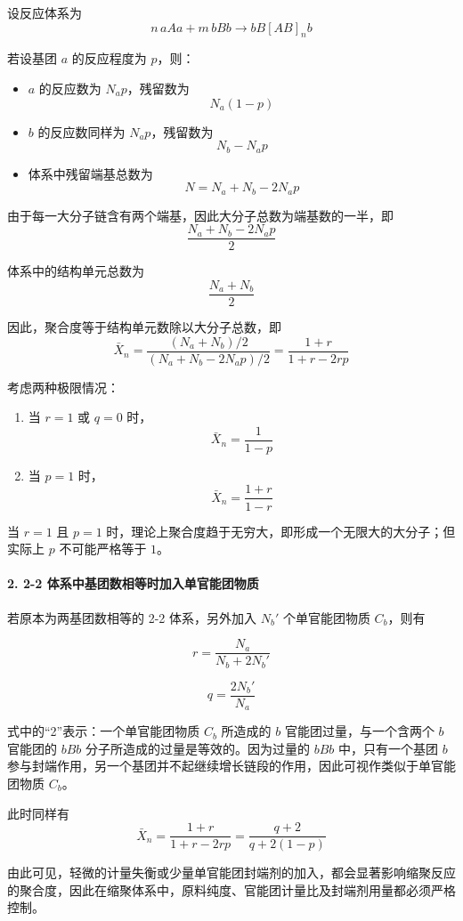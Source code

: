 ﻿\documentclass[12pt,a4paper]{article}
\begin{document}
设反应体系为
\[
n\,aAa+m\,bBb \longrightarrow bB[AB]_n b
\]

若设基团 $a$ 的反应程度为 $p$，则：

\begin{itemize}
    \item $a$ 的反应数为 $N_a p$，残留数为
    \[
    N_a(1-p)
    \]
    \item $b$ 的反应数同样为 $N_a p$，残留数为
    \[
    N_b-N_a p
    \]
    \item 体系中残留端基总数为
    \[
    N=N_a+N_b-2N_a p
    \]
\end{itemize}

由于每一大分子链含有两个端基，因此大分子总数为端基数的一半，即
\[
\frac{N_a+N_b-2N_a p}{2}
\]

体系中的结构单元总数为
\[
\frac{N_a+N_b}{2}
\]

因此，聚合度等于结构单元数除以大分子总数，即
\[
\bar{X}_n=
\frac{(N_a+N_b)/2}{(N_a+N_b-2N_a p)/2}
=
\frac{1+r}{1+r-2rp}
\]

考虑两种极限情况：

\begin{enumerate}[1)]
    \item 当 $r=1$ 或 $q=0$ 时，
    \[
    \bar{X}_n=\frac{1}{1-p}
    \]

    \item 当 $p=1$ 时，
    \[
    \bar{X}_n=\frac{1+r}{1-r}
    \]
\end{enumerate}

当 $r=1$ 且 $p=1$ 时，理论上聚合度趋于无穷大，即形成一个无限大的大分子；但实际上 $p$ 不可能严格等于 $1$。

\paragraph{2. 2-2 体系中基团数相等时加入单官能团物质}

若原本为两基团数相等的 2-2 体系，另外加入 $N_b'$ 个单官能团物质 $C_b$，则有

\[
r=\frac{N_a}{N_b+2N_b'}
\]

\[
q=\frac{2N_b'}{N_a}
\]

式中的“2”表示：一个单官能团物质 $C_b$ 所造成的 $b$ 官能团过量，与一个含两个 $b$ 官能团的 $bBb$ 分子所造成的过量是等效的。因为过量的 $bBb$ 中，只有一个基团 $b$ 参与封端作用，另一个基团并不起继续增长链段的作用，因此可视作类似于单官能团物质 $C_b$。

此时同样有
\[
\bar{X}_n=
\frac{1+r}{1+r-2rp}
=
\frac{q+2}{q+2(1-p)}
\]

由此可见，轻微的计量失衡或少量单官能团封端剂的加入，都会显著影响缩聚反应的聚合度，因此在缩聚体系中，原料纯度、官能团计量比及封端剂用量都必须严格控制。
\end{document}
